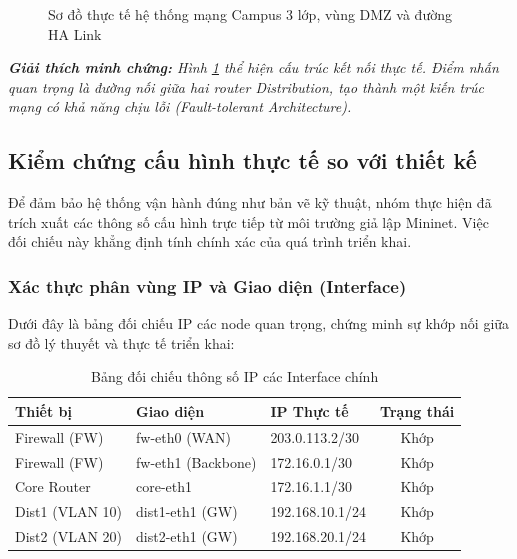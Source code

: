 \begin{figure}[H]
    \centering
    \caption{Sơ đồ thực tế hệ thống mạng Campus 3 lớp, vùng DMZ và đường HA Link}
    \label{fig:topology_actual}
\end{figure}
\textit{\textbf{Giải thích minh chứng:} Hình \ref{fig:topology_actual} thể hiện cấu trúc kết nối thực tế. Điểm nhấn quan trọng là đường nối giữa hai router Distribution, tạo thành một kiến trúc mạng có khả năng chịu lỗi (Fault-tolerant Architecture).}

\subsection{Kiểm chứng cấu hình thực tế so với thiết kế}
Để đảm bảo hệ thống vận hành đúng như bản vẽ kỹ thuật, nhóm thực hiện đã trích xuất các thông số cấu hình trực tiếp từ môi trường giả lập Mininet. Việc đối chiếu này khẳng định tính chính xác của quá trình triển khai.

\subsubsection{Xác thực phân vùng IP và Giao diện (Interface)}
Dưới đây là bảng đối chiếu IP các node quan trọng, chứng minh sự khớp nối giữa sơ đồ lý thuyết và thực tế triển khai:

\begin{table}[H]
    \centering
    \begin{tabular}{|l|l|l|c|}
    \hline
    \rowcolor[HTML]{2C3E50} 
    \color{white}\textbf{Thiết bị} & \color{white}\textbf{Giao diện} & \color{white}\textbf{IP Thực tế} & \color{white}\textbf{Trạng thái} \\ \hline
    Firewall (FW) & fw-eth0 (WAN) & 203.0.113.2/30 & Khớp \\ \hline
    Firewall (FW) & fw-eth1 (Backbone) & 172.16.0.1/30 & Khớp \\ \hline
    Core Router & core-eth1 & 172.16.1.1/30 & Khớp \\ \hline
    Dist1 (VLAN 10) & dist1-eth1 (GW) & 192.168.10.1/24 & Khớp \\ \hline
    Dist2 (VLAN 20) & dist2-eth1 (GW) & 192.168.20.1/24 & Khớp \\ \hline
    \end{tabular}
    \caption{Bảng đối chiếu thông số IP các Interface chính}
\end{table}

